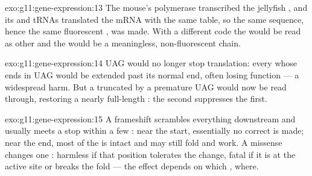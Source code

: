 \begin{solution}{exo:g11:gene-expression:13}
The mouse's  polymerase transcribed the jellyfish , and its
 and tRNAs translated the mRNA with the same  table, so
the same  sequence, hence the same fluorescent , was
made. With a different code the  would be read as other  and the  would be a meaningless, non-fluorescent chain.
\end{solution}

\begin{solution}{exo:g11:gene-expression:14}
UAG would no longer stop translation: every  whose  ends in
UAG would be extended past its normal end, often losing function ---
a widespread harm. But a  truncated by a premature UAG would now
be read through, restoring a nearly full-length : the second
 suppresses the first.
\end{solution}

\begin{solution}{exo:g11:gene-expression:15}
A frameshift scrambles everything downstream and usually meets a stop
within a few : near the start, essentially no correct  is
made; near the end, most of the  is intact and may still fold
and work. A missense changes one : harmless if that position
tolerates the change, fatal if it is at the active site or breaks the
fold --- the effect depends on which , where.
\end{solution}

